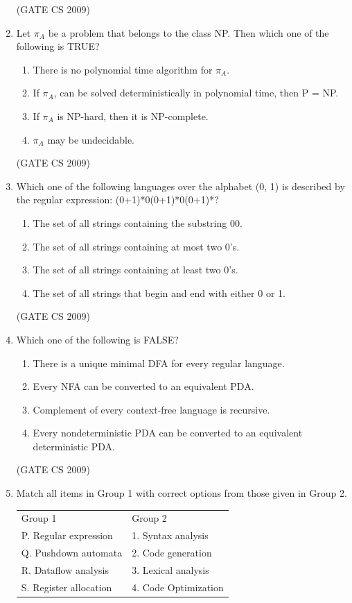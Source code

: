 \documentclass[a4paper, 11pt]{article}
\begin{document}
\begin{enumerate}
    \hfill (GATE CS 2009)

    \item Let $\pi_A$ be a problem that belongs to the class NP. Then which one of the following is TRUE?\\
    \begin{enumerate}
        \item There is no polynomial time algorithm for $\pi_A$.
        \item If $\pi_A$, can be solved deterministically in polynomial time, then P = NP.
        \item If $\pi_A$ is NP-hard, then it is NP-complete.
        \item $\pi_A$ may be undecidable.
    \end{enumerate}

    \hfill (GATE CS 2009)

    \item Which one of the following languages over the alphabet (0, 1) is described by the regular expression: (0+1)*0(0+1)*0(0+1)*?
    \begin{enumerate}[label=(\Alph*)]
        \item The set of all strings containing the substring 00. 
        \item The set of all strings containing at most two 0's.
        \item The set of all strings containing at least two 0's.
        \item The set of all strings that begin and end with either 0 or 1.
    \end{enumerate}

    \hfill (GATE CS 2009)

    \item Which one of the following is FALSE?
    \begin{enumerate}[label=(\Alph*)]
        \item There is a unique minimal DFA for every regular language.
        \item Every NFA can be converted to an equivalent PDA.
        \item Complement of every context-free language is recursive.
        \item Every nondeterministic PDA can be converted to an equivalent deterministic PDA.
    \end{enumerate}

    \hfill (GATE CS 2009)

    \item Match all items in Group 1 with correct options from those given in Group 2.\\
    \begin{tabular}{ll}
        Group 1 & Group 2 \\
        P. Regular expression & 1. Syntax analysis\\
        Q. Pushdown automata & 2. Code generation\\
        R. Dataflow analysis & 3. Lexical analysis \\
        S. Register allocation & 4. Code Optimization
    \end{tabular}


\end{enumerate}
\end{document}

